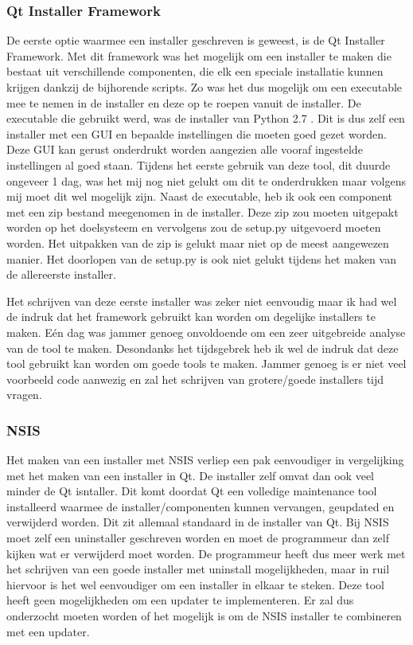 \documentclass{article}
\begin{document}
\subsubsection{Qt Installer Framework}
De eerste optie waarmee een installer geschreven is geweest, is de Qt Installer Framework.
Met dit framework was het mogelijk om een installer te maken die bestaat uit verschillende componenten, die elk een speciale installatie kunnen krijgen dankzij de bijhorende scripts.
Zo was het dus mogelijk om een executable mee te nemen in de installer en deze op te roepen vanuit de installer.
De executable die gebruikt werd, was de installer van Python 2.7 .
Dit is dus zelf een installer met een GUI en bepaalde instellingen die moeten goed gezet worden.
Deze GUI kan gerust onderdrukt worden aangezien alle vooraf ingestelde instellingen al goed staan.
Tijdens het eerste gebruik van deze tool, dit duurde ongeveer 1 dag, was het mij nog niet gelukt om dit te onderdrukken maar volgens mij moet dit wel mogelijk zijn.
Naast de executable, heb ik ook een component met een zip bestand meegenomen in de installer.
Deze zip zou moeten uitgepakt worden op het doelsysteem en vervolgens zou de setup.py uitgevoerd moeten worden.
Het uitpakken van de zip is gelukt maar niet op de meest aangewezen manier.
Het doorlopen van de setup.py is ook niet gelukt tijdens het maken van de allereerste installer.

Het schrijven van deze eerste installer was zeker niet eenvoudig maar ik had wel de indruk dat het framework gebruikt kan worden om degelijke installers te maken.
E\'en dag was jammer genoeg onvoldoende om een zeer uitgebreide analyse van de tool te maken.
Desondanks het tijdsgebrek heb ik wel de indruk dat deze tool gebruikt kan worden om goede tools te maken.
Jammer genoeg is er niet veel voorbeeld code aanwezig en zal het schrijven van grotere/goede installers tijd vragen.


\subsubsection{NSIS}
Het maken van een installer met NSIS verliep een pak eenvoudiger in vergelijking met het maken van een installer in Qt.
De installer zelf omvat dan ook veel minder de Qt isntaller. Dit komt doordat Qt een volledige maintenance tool installeerd waarmee de installer/componenten kunnen vervangen, geupdated en verwijderd worden.
Dit zit allemaal standaard in de installer van Qt.
Bij NSIS moet zelf een uninstaller geschreven worden en moet de programmeur dan zelf kijken wat er verwijderd moet worden.
De programmeur heeft dus meer werk met het schrijven van een goede installer met uninstall mogelijkheden, maar in ruil hiervoor is het wel eenvoudiger om een installer in elkaar te steken.
Deze tool heeft geen mogelijkheden om een updater te implementeren.
Er zal dus onderzocht moeten worden of het mogelijk is om de NSIS installer te combineren met een updater.
\end{document}
